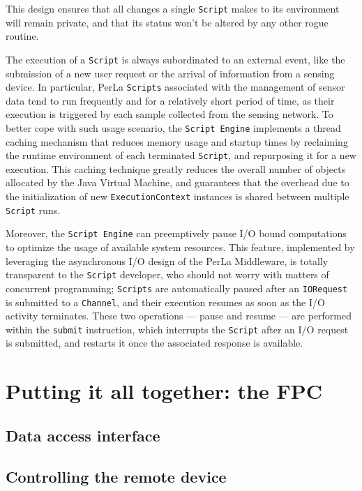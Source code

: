 This design ensures that all changes a single \texttt{Script} makes to its
environment will remain private, and that its status won't be altered by any
other rogue routine.

The execution of a \texttt{Script} is always subordinated to an external event,
like the submission of a new user request or the arrival of information from a
sensing device. In particular, PerLa \texttt{Scripts} associated with the
management of sensor data tend to run frequently and for a relatively short
period of time, as their execution is triggered by each sample collected from
the sensing network. To better cope with such usage scenario, the
\texttt{Script Engine} implements a thread caching mechanism that reduces
memory usage and startup times by reclaiming the runtime environment of each
terminated \texttt{Script}, and repurposing it for a new execution. This
caching technique greatly reduces the overall number of objects allocated by
the Java Virtual Machine, and guarantees that the overhead due to the
initialization of new \texttt{ExecutionContext} instances is shared between
multiple \texttt{Script} runs.

Moreover, the \texttt{Script Engine} can preemptively pause I/O bound
computations to optimize the usage of available system resources. This feature,
implemented by leveraging the asynchronous I/O design of the PerLa Middleware,
is totally transparent to the \texttt{Script} developer, who should not worry
with matters of concurrent programming; \texttt{Scripts} are automatically
paused after an \texttt{IORequest} is submitted to a \texttt{Channel}, and
their execution resumes as soon as the I/O activity terminates. These
two operations --- pause and resume --- are performed within the
\texttt{submit} instruction, which interrupts the \texttt{Script} after
an I/O request is submitted, and restarts it once the associated response is
available.


\section{Putting it all together: the FPC}

\subsection{Data access interface}

\subsection{Controlling the remote device}

